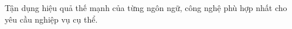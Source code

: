 Tận dụng hiệu quả thế mạnh của từng ngôn ngữ, công nghệ phù hợp nhất cho yêu cầu nghiệp vụ cụ thể.








